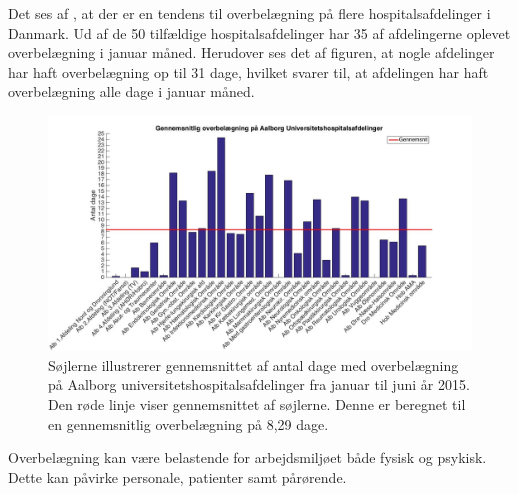 Det ses af , at der er en tendens til overbelægning på flere hospitalsafdelinger i Danmark. Ud af de 50 tilfældige hospitalsafdelinger har 35 af afdelingerne oplevet overbelægning i januar måned. Herudover ses det af figuren, at nogle afdelinger har haft overbelægning op til 31 dage, hvilket svarer til, at afdelingen har haft overbelægning alle dage i januar måned.

\begin{figure}[H]
\centering
\includegraphics[width=1\textwidth]{figures/overbelaegning_AUH}
\caption{Søjlerne illustrerer gennemsnittet af antal dage med overbelægning på Aalborg universitetshospitalsafdelinger fra januar til juni år 2015. \cite{SDS2015} Den røde linje viser gennemsnittet af søjlerne. Denne er beregnet til en gennemsnitlig overbelægning på 8,29 dage.}
\label{fig:overbelaegning_AUH}
\end{figure}

\noindent


Overbelægning kan være belastende for arbejdsmiljøet både fysisk og psykisk. Dette kan påvirke personale, patienter samt pårørende. 




